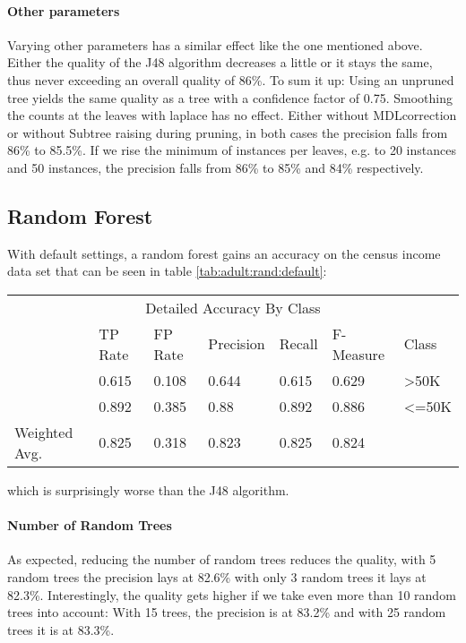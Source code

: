 \documentclass[paper=a4, fontsize=11pt]{scrartcl} %
\numberwithin{equation}{section} %
\numberwithin{figure}{section} %
\numberwithin{table}{section} %
\begin{document}
\paragraph{Other parameters}
Varying other parameters has a similar effect like the one mentioned above. Either the quality of the J48 algorithm decreases a little or it stays the same, thus never exceeding an overall quality of 86\%. To sum it up: Using an unpruned tree yields the same quality as a tree with a confidence factor of 0.75. Smoothing the counts at the leaves with laplace has no effect. Either without MDLcorrection or without Subtree raising during pruning, in both cases the precision falls from 86\% to 85.5\%. If we rise the minimum of instances per leaves, e.g. to 20 instances and 50 instances, the precision falls from 86\% to 85\% and 84\% respectively.



\subsection{Random Forest}

With default settings, a random forest gains an accuracy on the census income data set that can be seen in table \ref{tab:adult:rand:default}:
\begin{table*}[htb]\centering
  \begin{tabular*}{\columnwidth}{@{}lllllll@{}}
      \toprule 
      \multicolumn{7}{c}{Detailed Accuracy By Class} \\ 
              &  TP Rate & FP Rate & Precision & Recall & F-Measure & Class    \\  \midrule
              &  0.615   & 0.108   & 0.644     & 0.615  & 0.629     & >50K     \\     
              &  0.892   & 0.385   & 0.88      & 0.892  & 0.886     & <=50K    \\ 
Weighted Avg. &  0.825   & 0.318   & 0.823     & 0.825  & 0.824     &          \\ \bottomrule
    \end{tabular*}
\caption{Random Forest -- Default Settings} 
\label{tab:adult:rand:default}
\end{table*}
\FloatBarrier
which is surprisingly worse than the J48 algorithm. 

\paragraph{Number of Random Trees}
As expected, reducing the number of random trees reduces the quality, with 5 random trees the precision lays at 82.6\% with only 3 random trees it lays at 82.3\%. Interestingly, the quality gets higher if we take even more than 10 random trees into account: With 15 trees, the precision is at 83.2\% and with 25 random trees it is at 83.3\%.
\end{document}
